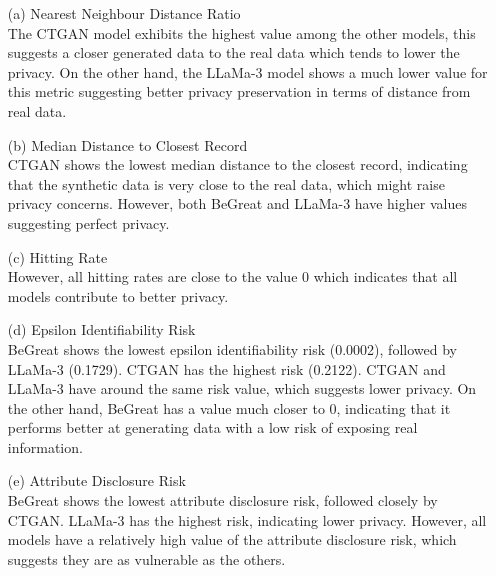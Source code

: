 \begin{enumerate}
    \item[(a)] Nearest Neighbour Distance Ratio \\
    The CTGAN model exhibits the highest value among the other models, this suggests a closer generated data to the real data which tends to lower the privacy. On the other hand, the LLaMa-3 model shows a much lower value for this metric suggesting better privacy preservation in terms of distance from real data.

    \item[(b)] Median Distance to Closest Record \\
    CTGAN shows the lowest median distance to the closest record, indicating that the synthetic data is very close to the real data, which might raise privacy concerns. However, both BeGreat and LLaMa-3 have higher values suggesting perfect privacy.

    
    \item[(c)] Hitting Rate \\
    However, all hitting rates are close to the value 0 which indicates that all models contribute to better privacy.


    \item[(d)] Epsilon Identifiability Risk \\
    BeGreat shows the lowest epsilon identifiability risk (0.0002), followed by LLaMa-3 (0.1729). CTGAN has the highest risk (0.2122). CTGAN and LLaMa-3 have around the same risk value, which suggests lower privacy. On the other hand, BeGreat has a value much closer to 0, indicating that it performs better at generating data with a low risk of exposing real information. 

    \item[(e)] Attribute Disclosure Risk \\
    BeGreat shows the lowest attribute disclosure risk, followed closely by CTGAN. LLaMa-3 has the highest risk, indicating lower privacy. However, all models have a relatively high value of the attribute disclosure risk, which suggests they are as vulnerable as the others. %
    
\end{enumerate}















